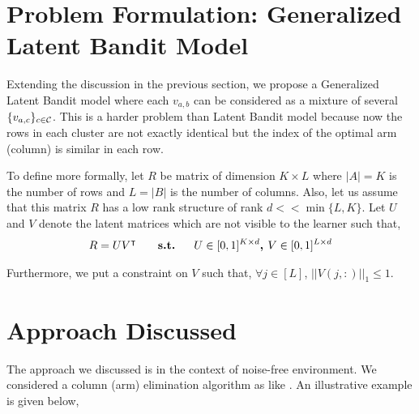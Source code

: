 \documentclass[twoside]{article}
\begin{document}
\section{Problem Formulation: Generalized Latent Bandit Model}
	
	Extending the discussion in the previous section, we propose a Generalized Latent Bandit model where each $v_{a,b}$ can be considered as a mixture of several $\lbrace v_{a,c}\rbrace_{c\in\mathcal{C}}$. This is a harder problem than Latent Bandit model because now the rows in each cluster are not exactly identical but the index of the optimal arm (column) is similar in each row.
	
	To define more formally, let $R$ be matrix of  dimension $K\times L$ where $|A|=K$ is the number of rows and $L=|B|$ is the number of columns. Also, let us assume that this matrix  $R$ has a low rank structure of rank $d << \min\lbrace L,K\rbrace$. Let $U$ and $V$ denote the latent matrices which are not visible to the learner such that,
\begin{align*}
	R = UV^{\intercal} \textbf{ \hspace*{4mm}   s.t.   \hspace*{4mm}} U\in [ 0,1 ]^{K\times d} \textbf{, } V\in  [0,1]^{L\times d} 
\end{align*}	  
	
	Furthermore, we put a constraint on $V$ such that, $\forall j\in [L]$, $ ||V(j,:)||_1 \leq 1$. 
	
	
%	
	
	
\section{Approach Discussed}

The approach we discussed is in the context of noise-free environment. We considered a column (arm) elimination algorithm as like \citet{auer2010ucb}. An illustrative example is given below, 
\end{document}

